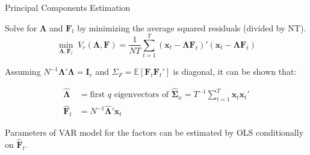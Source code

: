 \documentclass{beamer}
\begin{document}
\begin{frame}{Principal Components Estimation}

 Solve for $\boldsymbol{\Lambda}$ and $\boldsymbol{F}_t$ by minimizing the average squared residuals (divided by NT).
\begin{equation}
    \min_{\boldsymbol{\Lambda}, \boldsymbol{F}_t} \; V_r(\boldsymbol{\Lambda}, \boldsymbol{F}) 
    = \frac{1}{NT} \sum_{t=1}^{T} (\boldsymbol{x}_t - \boldsymbol{\Lambda} \boldsymbol{F}_t)' (\boldsymbol{x}_t - \boldsymbol{\Lambda} \boldsymbol{F}_t)
\end{equation}

 Assuming $N^{-1} \boldsymbol{\Lambda}' \boldsymbol{\Lambda} = \boldsymbol{I}_r$ and $ \Sigma_F = \mathbb{E}[\boldsymbol{F}_t \boldsymbol{F}_t']$ is diagonal, it can be shown that: 

\begin{equation}
\begin{aligned}
    \widehat{\boldsymbol{\Lambda}} &= \text{first $q$ eigenvectors of } \widehat{\boldsymbol{\Sigma}}_x = T^{-1} \sum_{t=1}^{T} \boldsymbol{x}_t \boldsymbol{x}_t' \\
        \widehat{\boldsymbol{F}}_t &= N^{-1} \widehat{\boldsymbol{\Lambda}}' \boldsymbol{x}_t 
\end{aligned}
\end{equation}

 Parameters of VAR model for the factors can be estimated by OLS conditionally on $\widehat{\boldsymbol{F}}_t$.  

\end{frame}
\end{document}
